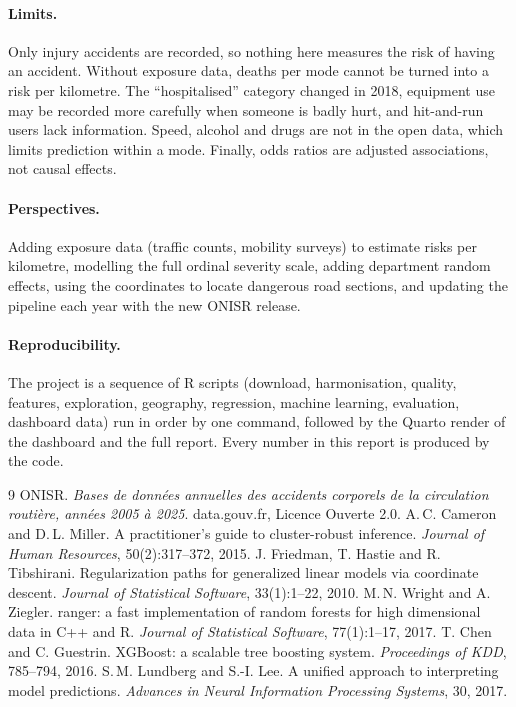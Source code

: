 \documentclass[11pt,a4paper]{article}
\begin{document}
\paragraph{Limits.} Only injury accidents are recorded, so nothing here measures the risk of having an
accident. Without exposure data, deaths per mode cannot be turned into a risk per kilometre. The
``hospitalised'' category changed in 2018, equipment use may be recorded more carefully when someone is
badly hurt, and hit-and-run users lack information. Speed, alcohol and drugs are not in the open data,
which limits prediction within a mode. Finally, odds ratios are adjusted associations, not causal effects.

\paragraph{Perspectives.} Adding exposure data (traffic counts, mobility surveys) to estimate risks per
kilometre, modelling the full ordinal severity scale, adding department random effects, using the
coordinates to locate dangerous road sections, and updating the pipeline each year with the new ONISR
release.

\paragraph{Reproducibility.} The project is a sequence of R scripts (download, harmonisation, quality,
features, exploration, geography, regression, machine learning, evaluation, dashboard data) run in order
by one command, followed by the Quarto render of the dashboard and the full report. Every number in this
report is produced by the code.

\begin{thebibliography}{9}
\small
{} ONISR. \emph{Bases de données annuelles des accidents corporels de la circulation
routière, années 2005 à 2025}. data.gouv.fr, Licence Ouverte 2.0.
 A.\,C. Cameron and D.\,L. Miller. A practitioner's guide to cluster-robust inference.
\emph{Journal of Human Resources}, 50(2):317--372, 2015.
 J. Friedman, T. Hastie and R. Tibshirani. Regularization paths for generalized linear
models via coordinate descent. \emph{Journal of Statistical Software}, 33(1):1--22, 2010.
 M.\,N. Wright and A. Ziegler. ranger: a fast implementation of random forests for high
dimensional data in C++ and R. \emph{Journal of Statistical Software}, 77(1):1--17, 2017.
 T. Chen and C. Guestrin. XGBoost: a scalable tree boosting system. \emph{Proceedings of
KDD}, 785--794, 2016.
 S.\,M. Lundberg and S.-I. Lee. A unified approach to interpreting model predictions.
\emph{Advances in Neural Information Processing Systems}, 30, 2017.
\end{thebibliography}
\end{document}
